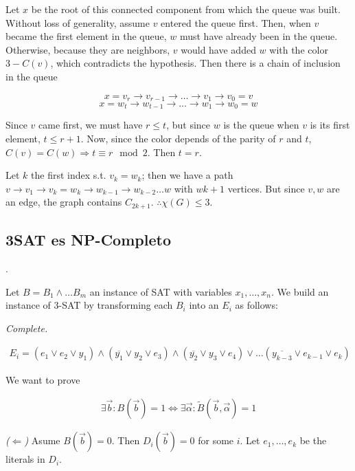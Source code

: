 \documentclass[a4paper, 12pt]{article}
\begin{document}
Let $x$  be the root of this connected component from which the queue was
built. Without loss of generality, assume $v$ entered the queue first. 
Then, when $v$ became the first element in the queue, $w$ must have 
already been in the queue. Otherwise, because they are neighbors, $v$
would have added $w$ with the color $3 - C(v)$, which contradicts the 
hypothesis. Then there is a chain of inclusion in the queue

$$x = v_r \to v_{r-1} \to  \ldots \to v_1 \to  v_0 = v$$
$$x = w_t \to w_{t-1} \to  \ldots \to w_1 \to  w_0 = w$$

Since $v$ came first, we must have $r \leq t$, but since $w$ is the queue when
$v$ is its first element, $t \leq r+1$. Now, since the color depends of the
parity of $r$ and $t$, $C(v) = C(w) \Rightarrow t \equiv r \mod 2$. Then $t =
r$.

Let $k$ the first index s.t. $v_k = w_k$; then we have a path $v \to  v_1 \to
v_k = w_k \to  w_{k-1} \to  w_{k-2} \ldots w$ with $wk + 1$ vertices. But since
$v, w$ are an edge, the graph contains $C_{2k+1}$. $\therefore \chi(G) \leq 3$.




\pagebreak

\subsection{3SAT es NP-Completo}.

Let $B = B_1 \land  \ldots B_m$ an instance of SAT with variables 
$x_1, \ldots, x_n$. We build an instance of $3$-SAT 
by transforming each $B_i$ into an $E_i$ as follows:

\textit{Complete.}

\begin{align*}
E_i = (e_1 \lor  e_2 \lor y_1) \land  (\overline{y_1} \lor  y_2 \lor  e_3) \land  (\overline{y_2} \lor  y_3 \lor  e_4) \lor \ldots (\overline{y_{k-3}} \lor e_{k-1} \lor e_{k})
\end{align*}

We want to prove

\begin{align*}
    \exists \overrightarrow{b} : B(\overrightarrow{b}) = 1 \iff \exists \overrightarrow{\alpha} : \tilde{ B }(\overrightarrow{b}, \overrightarrow{\alpha}) = 1
\end{align*}

\textit{($\Leftarrow$)} Asume $B(\overrightarrow{b}) = 0$. Then
$D_i(\overrightarrow{b}) = 0$ for some $i$. Let 
 $e_1, \ldots, e_k$ be the literals in $D_i$.
\end{document}
